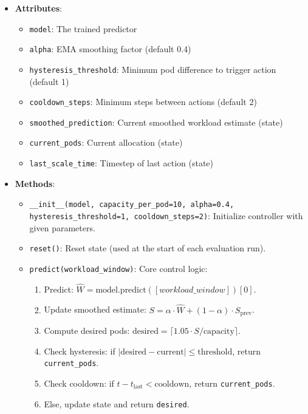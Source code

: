 \begin{itemize}
  \item \textbf{Attributes}:
  \begin{itemize}
    \item \texttt{model}: The trained predictor
    \item \texttt{alpha}: EMA smoothing factor (default 0.4)
    \item \texttt{hysteresis\_threshold}: Minimum pod difference to trigger action (default 1)
    \item \texttt{cooldown\_steps}: Minimum steps between actions (default 2)
    \item \texttt{smoothed\_prediction}: Current smoothed workload estimate (state)
    \item \texttt{current\_pods}: Current allocation (state)
    \item \texttt{last\_scale\_time}: Timestep of last action (state)
  \end{itemize}
  
  \item \textbf{Methods}:
  \begin{itemize}
    \item \texttt{\_\_init\_\_(model, capacity\_per\_pod=10, alpha=0.4, hysteresis\_threshold=1, cooldown\_steps=2)}: Initialize controller with given parameters.
    \item \texttt{reset()}: Reset state (used at the start of each evaluation run).
    \item \texttt{predict(workload\_window)}: Core control logic:
    \begin{enumerate}
      \item Predict: $\hat{W} = \text{model.predict}([workload\_window])[0]$.
      \item Update smoothed estimate: $S = \alpha \cdot \hat{W} + (1 - \alpha) \cdot S_{\text{prev}}$.
      \item Compute desired pods: $\text{desired} = \lceil 1.05 \cdot S / \text{capacity} \rceil$.
      \item Check hysteresis: if $|\text{desired} - \text{current}| \leq \text{threshold}$, return \texttt{current\_pods}.
      \item Check cooldown: if $t - t_{\text{last}} < \text{cooldown}$, return \texttt{current\_pods}.
      \item Else, update state and return \texttt{desired}.
    \end{enumerate}
  \end{itemize}
\end{itemize}

